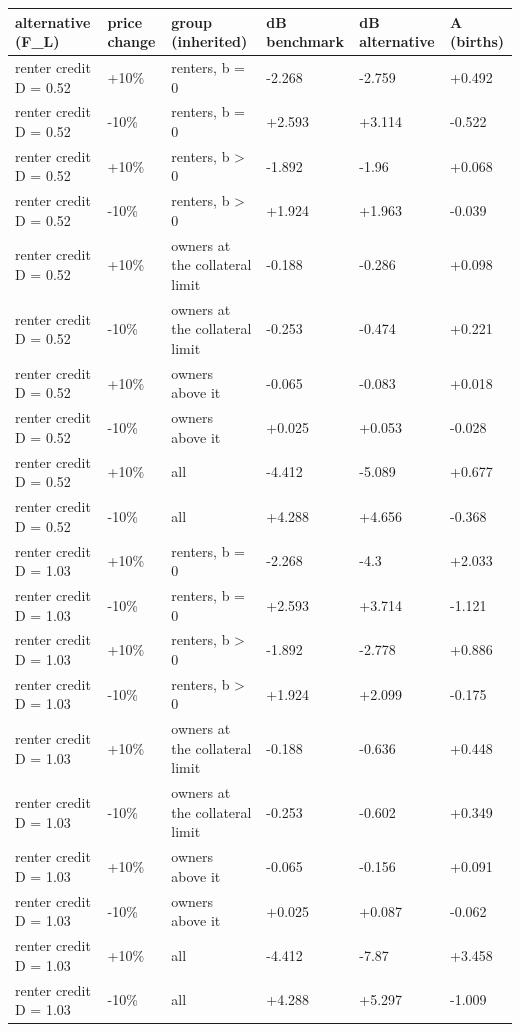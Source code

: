 \begingroup\small
\setlength{\tabcolsep}{3pt}
\renewcommand{\arraystretch}{1.04}
\begin{tabularx}{\linewidth}{XXXXXX}
\toprule
alternative (F\_L) & price change & group (inherited) & dB benchmark & dB alternative & A (births) \\
\midrule
renter credit D = 0.52 & +10\% & renters, b = 0 & -2.268 & -2.759 & +0.492 \\
renter credit D = 0.52 & -10\% & renters, b = 0 & +2.593 & +3.114 & -0.522 \\
renter credit D = 0.52 & +10\% & renters, b \textgreater{} 0 & -1.892 & -1.96 & +0.068 \\
renter credit D = 0.52 & -10\% & renters, b \textgreater{} 0 & +1.924 & +1.963 & -0.039 \\
renter credit D = 0.52 & +10\% & owners at the collateral limit & -0.188 & -0.286 & +0.098 \\
renter credit D = 0.52 & -10\% & owners at the collateral limit & -0.253 & -0.474 & +0.221 \\
renter credit D = 0.52 & +10\% & owners above it & -0.065 & -0.083 & +0.018 \\
renter credit D = 0.52 & -10\% & owners above it & +0.025 & +0.053 & -0.028 \\
renter credit D = 0.52 & +10\% & all & -4.412 & -5.089 & +0.677 \\
renter credit D = 0.52 & -10\% & all & +4.288 & +4.656 & -0.368 \\
renter credit D = 1.03 & +10\% & renters, b = 0 & -2.268 & -4.3 & +2.033 \\
renter credit D = 1.03 & -10\% & renters, b = 0 & +2.593 & +3.714 & -1.121 \\
renter credit D = 1.03 & +10\% & renters, b \textgreater{} 0 & -1.892 & -2.778 & +0.886 \\
renter credit D = 1.03 & -10\% & renters, b \textgreater{} 0 & +1.924 & +2.099 & -0.175 \\
renter credit D = 1.03 & +10\% & owners at the collateral limit & -0.188 & -0.636 & +0.448 \\
renter credit D = 1.03 & -10\% & owners at the collateral limit & -0.253 & -0.602 & +0.349 \\
renter credit D = 1.03 & +10\% & owners above it & -0.065 & -0.156 & +0.091 \\
renter credit D = 1.03 & -10\% & owners above it & +0.025 & +0.087 & -0.062 \\
renter credit D = 1.03 & +10\% & all & -4.412 & -7.87 & +3.458 \\
renter credit D = 1.03 & -10\% & all & +4.288 & +5.297 & -1.009 \\
\bottomrule
\end{tabularx}
\endgroup
